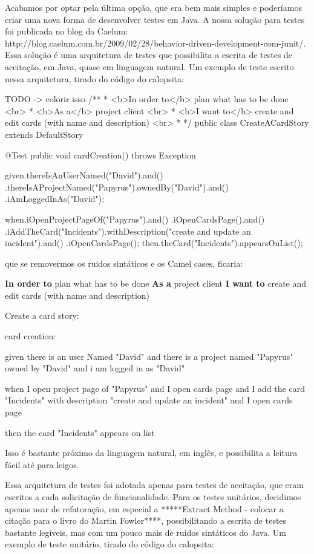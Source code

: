 Acabamos por optar pela última opção, que era bem mais simples e poderíamos criar uma nova forma de desenvolver 
testes em Java. A nossa solução para testes foi publicada no blog da Caelum: 
http://blog.caelum.com.br/2009/02/28/behavior-driven-development-com-junit/. Essa solução é uma arquitetura de 
testes que possibilita a escrita de testes de aceitação, em Java, quase em linguagem natural. Um exemplo de teste 
escrito nessa arquitetura, tirado do código do calopsita:

TODO -> colorir isso
/**
 * <b>In order to</b> plan what has to be done <br>
 * <b>As a</b> project client <br>
 * <b>I want to</b> create and edit cards (with name and description) <br>
 *
 */
public class CreateACardStory extends DefaultStory {

	@Test
	public void cardCreation() throws Exception {
		given.thereIsAnUserNamed("David").and()
			.thereIsAProjectNamed("Papyrus").ownedBy("David").and()
			.iAmLoggedInAs("David");

		when.iOpenProjectPageOf("Papyrus").and()
		    .iOpenCardsPage().and()
			.iAddTheCard("Incidents").withDescription("create and update an incident").and()
			.iOpenCardsPage();
		then.theCard("Incidents").appearsOnList();
	}
}

que se removermos os ruidos sintáticos e os Camel cases, ficaria:

{\bf In order to} plan what has to be done
{\bf As a} project client
{\bf I want to} create and edit cards (with name and description)

Create a card story:

card creation:
	
		given there is an user Named "David" and
			there is a project named "Papyrus" owned by "David" and
			i am logged in as "David"

		when I open project page of "Papyrus" and
		  I open cards page and
			I add the card "Incidents" with description "create and update an incident" and
			I open cards page
			
		then the card "Incidents" appears on list

Isso é bastante próximo da linguagem natural, em inglês, e possibilita a leitura fácil até para leigos.

Essa arquitetura de testes foi adotada apenas para testes de aceitação, que eram escritos a cada solicitação de
funcionalidade. Para os testes unitários, decidimos apenas usar de refatoração, em especial a 
*****Extract Method - colocar a citação para o livro do Martin Fowler****, possibilitando a escrita de testes bastante
legíveis, mas com um pouco mais de ruidos sintáticos do Java. Um exemplo de teste unitário, tirado do código do calopsita:


